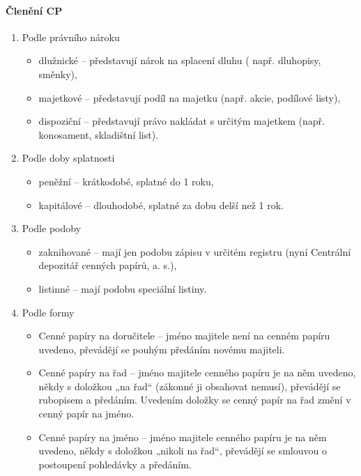 \paragraph{Členění CP}
\begin{enumerate}
    \item Podle právního nároku
        \begin{itemize}
            \item dlužnické -- představují nárok na splacení dluhu ( např. dluhopisy, směnky),
            \item majetkové -- představují podíl na majetku (např. akcie, podílové listy),
            \item dispoziční -- představují právo nakládat s určitým majetkem (např. konosament, skladištní list).
        \end{itemize}
    \item Podle doby splatnosti
        \begin{itemize}
            \item peněžní -- krátkodobé, splatné do 1 roku,
            \item kapitálové -- dlouhodobé, splatné za dobu delší než 1 rok.
        \end{itemize}
    \item Podle podoby
        \begin{itemize}
            \item zaknihované -- mají jen podobu zápisu v určitém registru (nyní Centrální depozitář cenných papírů, a. s.),
            \item listinné -- mají podobu speciální listiny.
        \end{itemize}
    \item Podle formy
        \begin{itemize}
            \item Cenné papíry na doručitele -- jméno majitele není na cenném papíru uvedeno, převádějí se pouhým předáním novému majiteli.
            \item Cenné papíry na řad -- jméno majitele cenného papíru je na něm uvedeno, někdy s doložkou „na řad“ (zákonné ji obsahovat nemusí), převádějí se rubopisem a předáním. Uvedením doložky  se cenný papír na řad změní v cenný papír na jméno.
            \item Cenné papíry na jméno -- jméno majitele cenného papíru je na něm uvedeno, někdy s doložkou „nikoli na řad“, převádějí se smlouvou o postoupení pohledávky a předáním.
        \end{itemize}

\end{enumerate}
